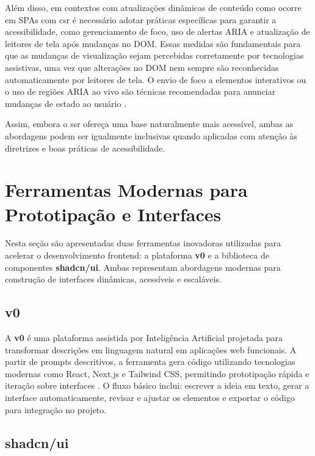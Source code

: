 Além disso, em contextos com atualizações dinâmicas de conteúdo como ocorre em SPAs com \acrshort{csr} é necessário adotar práticas específicas para garantir a acessibilidade, como gerenciamento de foco, uso de alertas ARIA e atualização de leitores de tela após mudanças no DOM. Essas medidas são fundamentais para que as mudanças de visualização sejam percebidas corretamente por tecnologias assistivas, uma vez que alterações no DOM nem sempre são reconhecidas automaticamente por leitores de tela. O envio de foco a elementos interativos ou o uso de regiões ARIA ao vivo são técnicas recomendadas para anunciar mudanças de estado ao usuário \cite{sutton2018}.

Assim, embora o \acrshort{ssr} ofereça uma base naturalmente mais acessível, ambas as abordagens podem ser igualmente inclusivas quando aplicadas com atenção às diretrizes e boas práticas de acessibilidade.



\section{Ferramentas Modernas para Prototipação e Interfaces}
\label{sec:ferramentas-modernas}

Nesta seção são apresentadas duas ferramentas inovadoras utilizadas para acelerar o desenvolvimento frontend: a plataforma \textbf{v0} e a biblioteca de componentes \textbf{shadcn/ui}. Ambas representam abordagens modernas para construção de interfaces dinâmicas, acessíveis e escaláveis.

\subsection{v0}
\label{subsec:v0}

A \textbf{v0} é uma plataforma assistida por Inteligência Artificial projetada para transformar descrições em linguagem natural em aplicações web funcionais. A partir de prompts descritivos, a ferramenta gera código utilizando tecnologias modernas como React, Next.js e Tailwind CSS, permitindo prototipação rápida e iteração sobre interfaces \cite{v0_docs}. O fluxo básico inclui: escrever a ideia em texto, gerar a interface automaticamente, revisar e ajustar os elementos e exportar o código para integração no projeto.

\subsection{shadcn/ui}
\label{subsec:shadcn}

